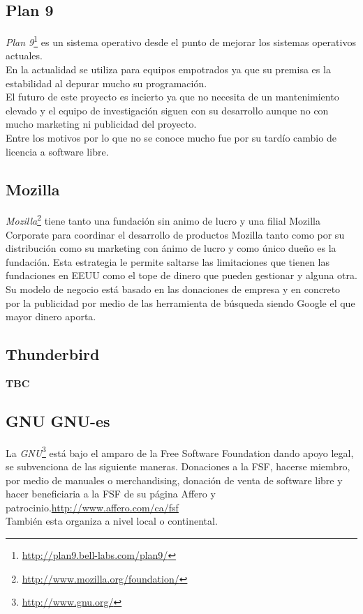 \documentclass[12pt]{article} %
\begin{document}
\subsection{Plan 9} %

\emph{Plan 9}\footnote{\url{http://plan9.bell-labs.com/plan9/}} es un sistema operativo desde el punto de mejorar los sistemas operativos actuales.\\En la actualidad se utiliza para equipos empotrados ya que su premisa es la estabilidad al depurar mucho su programación.\\El futuro de este proyecto es incierto ya que no necesita de un mantenimiento elevado y el equipo de investigación siguen con su desarrollo aunque no con mucho marketing ni publicidad del proyecto.\\Entre los motivos por lo que no se conoce mucho fue por su tardío cambio de licencia a software libre. 
\subsection{Mozilla} %

\emph{Mozilla}\footnote{\url{http://www.mozilla.org/foundation/}} tiene tanto una fundación sin animo de lucro y una filial Mozilla Corporate para coordinar el desarrollo de productos Mozilla tanto como por su distribución como su marketing con ánimo de lucro y como único dueño es la fundación. Esta estrategia le permite saltarse las limitaciones que tienen las fundaciones en EEUU como el tope de dinero que pueden gestionar y alguna otra.\\ Su modelo de negocio está basado en las donaciones de empresa y en concreto por la publicidad por medio de las herramienta de búsqueda siendo Google el que mayor dinero aporta.
\subsection{Thunderbird} %

\textbf{TBC}
\subsection{GNU GNU-es} %
La \emph{GNU}\footnote{\url{http://www.gnu.org/}} está bajo el amparo de la Free Software Foundation dando apoyo legal, se subvenciona de las siguiente maneras. Donaciones a la FSF, hacerse miembro, por medio de manuales o merchandising, donación de venta de software libre y hacer beneficiaria a la FSF de su página Affero y patrocinio.\url{http://www.affero.com/ca/fsf}\\También esta organiza a nivel local o continental.
\end{document}
